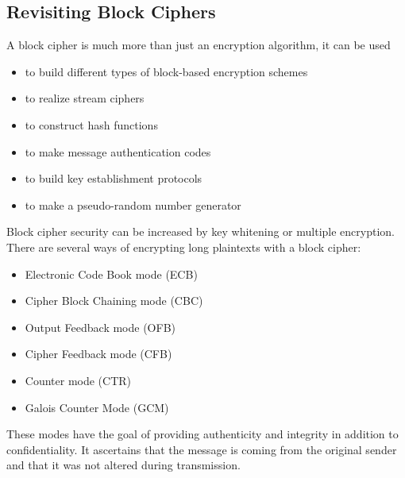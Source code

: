 \documentclass{math}
\begin{document}
\subsection*{Revisiting Block Ciphers}
A block cipher is much more than just an encryption algorithm, it can be used
\begin{itemize}
  \item to build different types of block-based encryption schemes
  \item to realize stream ciphers
  \item to construct hash functions
  \item to make message authentication codes
  \item to build key establishment protocols
  \item to make a pseudo-random number generator
\end{itemize}
Block cipher security can be increased by key whitening or multiple encryption.
There are several ways of encrypting long plaintexts with a block cipher:
\begin{itemize}
  \item Electronic Code Book mode (ECB)
  \item Cipher Block Chaining mode (CBC)
  \item Output Feedback mode (OFB)
  \item Cipher Feedback mode (CFB)
  \item Counter mode (CTR)
  \item Galois Counter Mode (GCM)
\end{itemize}
These modes have the goal of providing authenticity and integrity in addition to
confidentiality. It ascertains that the message is coming from the original
sender and that it was not altered during transmission.
\end{document}
